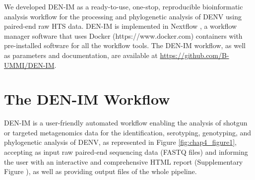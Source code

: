 We developed DEN-IM as a ready-to-use, one-stop, reproducible bioinformatic analysis workflow for the processing and phylogenetic analysis of DENV using paired-end raw HTS data. DEN-IM is implemented in Nextflow \citep{di_tommaso_nextflow_2017}, a workflow manager software that uses Docker (https://www.docker.com) containers with pre-installed software for all the workflow tools. The DEN-IM workflow, as well as parameters and documentation, are available at \url{https://github.com/B-UMMI/DEN-IM}.

\section{The DEN-IM Workflow}

DEN-IM is a user-friendly automated workflow enabling the analysis of shotgun or targeted metagenomics data for the identification, serotyping, genotyping, and phylogenetic analysis of DENV, as represented in Figure \ref{fig:chap4_figure1}, accepting as input raw paired-end sequencing data (FASTQ files) and informing the user with an interactive and comprehensive HTML report (Supplementary Figure ), as well as providing output files of the whole pipeline. 

